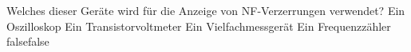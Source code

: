    {Welches dieser Geräte wird für die Anzeige von NF-Verzerrungen verwendet?}
    {Ein Oszilloskop}
    {Ein Transistorvoltmeter}
    {Ein Vielfachmessgerät}
    {Ein Frequenzzähler}
    {false}{false}